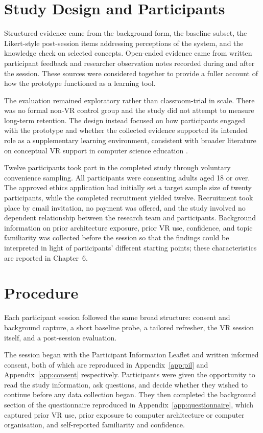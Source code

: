 \section{Study Design and Participants}

Structured evidence came from the background form, the baseline subset, the Likert-style post-session items addressing perceptions of the system, and the knowledge check on selected concepts. Open-ended evidence came from written participant feedback and researcher observation notes recorded during and after the session. These sources were considered together to provide a fuller account of how the prototype functioned as a learning tool.

The evaluation remained exploratory rather than classroom-trial in scale. There was no formal non-VR control group and the study did not attempt to measure long-term retention. The design instead focused on how participants engaged with the prototype and whether the collected evidence supported its intended role as a supplementary learning environment, consistent with broader literature on conceptual VR support in computer science education \cite{janani2026virtual,dengel2020important}.

Twelve participants took part in the completed study through voluntary convenience sampling. All participants were consenting adults aged 18 or over. The approved ethics application had initially set a target sample size of twenty participants, while the completed recruitment yielded twelve. Recruitment took place by email invitation, no payment was offered, and the study involved no dependent relationship between the research team and participants. Background information on prior architecture exposure, prior VR use, confidence, and topic familiarity was collected before the session so that the findings could be interpreted in light of participants' different starting points; these characteristics are reported in Chapter~6.

\section{Procedure}

Each participant session followed the same broad structure: consent and background capture, a short baseline probe, a tailored refresher, the VR session itself, and a post-session evaluation.

The session began with the Participant Information Leaflet and written informed consent, both of which are reproduced in Appendix~\ref{app:pil} and Appendix~\ref{app:consent} respectively. Participants were given the opportunity to read the study information, ask questions, and decide whether they wished to continue before any data collection began. They then completed the background section of the questionnaire reproduced in Appendix~\ref{app:questionnaire}, which captured prior VR use, prior exposure to computer architecture or computer organisation, and self-reported familiarity and confidence.

